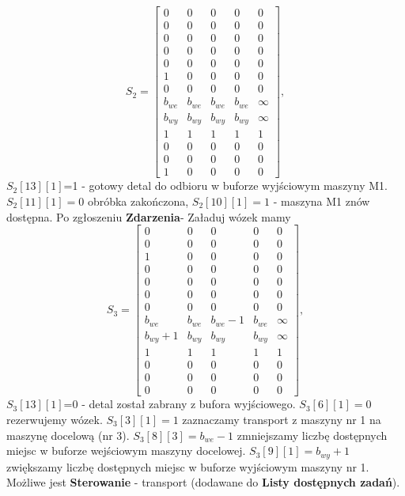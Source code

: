 \documentclass[10pt, a4paper]{article}
\begin{document}
\begin{itemize}
\begin{equation*}
S_2=\left[\begin{array}{ccccc}
0 & 0 & 0 & 0&0\\
0 & 0 & 0 & 0 & 0\\
0 & 0 & 0 & 0& 0\\
0 & 0 & 0 & 0& 0\\
0 & 0 & 0 & 0& 0\\
1 & 0 & 0 & 0 & 0\\
0 & 0 & 0 & 0& 0\\
b_{we}& b_{we}& b_{we}& b_{we} & \infty\\
b_{wy}& b_{wy}& b_{wy}& b_{wy} & \infty\\
1& 1& 1& 1 & 1\\
0 & 0 & 0 & 0 & 0\\
0 & 0 & 0 & 0 & 0\\
1 & 0 & 0 & 0 & 0
\end{array}\right],
\end{equation*}
$S_2[13][1]$=1 - gotowy detal do odbioru w buforze wyjściowym maszyny M1. $S_2[11][1]=0$ obróbka zakończona, $S_2[10][1]=1$ - maszyna M1 znów dostępna. Po zgłoszeniu \textbf{Zdarzenia}- Załaduj wózek mamy
\begin{equation*}
S_3=\left[\begin{array}{ccccc}
0 & 0 & 0 & 0&0\\
0 & 0 & 0 & 0 & 0\\
1 & 0 & 0 & 0& 0\\
0 & 0 & 0 & 0& 0\\
0 & 0 & 0 & 0& 0\\
0 & 0 & 0 & 0 & 0\\
0 & 0 & 0 & 0& 0\\
b_{we}& b_{we}& b_{we}-1& b_{we} & \infty\\
b_{wy}+1& b_{wy}& b_{wy}& b_{wy} & \infty\\
1& 1& 1& 1 & 1\\
0 & 0 & 0 & 0 & 0\\
0 & 0 & 0 & 0 & 0\\
0 & 0 & 0 & 0 & 0
\end{array}\right],
\end{equation*}
$S_3[13][1]$=0 - detal został zabrany z bufora wyjściowego. $S_3[6][1]=0$ rezerwujemy wózek. $S_3[3][1]=1$ zaznaczamy transport z maszyny nr 1 na maszynę docelową (nr 3). $S_3[8][3]=b_{we}-1$ zmniejszamy liczbę dostępnych miejsc w buforze wejściowym maszyny docelowej. $S_3[9][1]=b_{wy}+1$ zwiększamy liczbę dostępnych miejsc w buforze wyjściowym maszyny nr 1. Możliwe jest \textbf{Sterowanie} - transport (dodawane do \textbf{Listy dostępnych zadań}).

\end{itemize}
\end{document}
